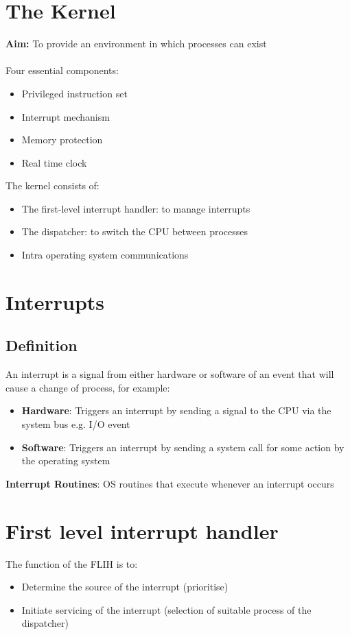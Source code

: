 \documentclass{article}[18pt]
\begin{document}
\section{The Kernel}
\textbf{Aim:} To provide an environment in which processes can exist\\
\\
Four essential components:
\begin{itemize}
	\item Privileged instruction set
	\item Interrupt mechanism
	\item Memory protection
	\item Real time clock
\end{itemize}
The kernel consists of:
\begin{itemize}
	\item The first-level interrupt handler: to manage interrupts
	\item The dispatcher: to switch the CPU between processes
	\item Intra operating system communications
\end{itemize}
\section{Interrupts}
\subsection{Definition}
An interrupt is a signal from either hardware or software of an event that will cause a change of process, for example:
\begin{itemize}
	\item \textbf{Hardware}: Triggers an interrupt by sending a signal to the CPU via the system bus e.g. I/O event
	\item \textbf{Software}: Triggers an interrupt by sending a system call for some action by the operating system
\end{itemize}
\textbf{Interrupt Routines}: OS routines that execute whenever an interrupt occurs
\section{First level interrupt handler}
The function of the FLIH is to:
\begin{itemize}
	\item Determine the source of the interrupt (prioritise)
	\item Initiate servicing of the interrupt (selection of suitable process of the dispatcher)
\end{itemize}
\end{document}
